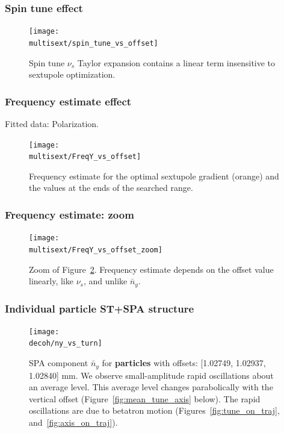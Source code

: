 \documentclass{beamer}
\newcommand{\home}{\string~}
\newcommand{\Artem}{\home/REPOS/COSYINF/img/Artem}
\newcommand{\multisext}{\Artem/multisext_test}
\newcommand{\decoh}{\Artem/decoherence_frequency_dependence}
\begin{document}
\begin{frame}\frametitle{Spin tune effect}
  \begin{figure}[H]
    \centering
    \texttt{[image: \\multisext/spin\_tune\_vs\_offset]}
    \caption{Spin tune $\nu_s$ Taylor expansion contains a linear term insensitive to sextupole optimization.\label{fig:SpinTune_vs_Y0_GSY}}
  \end{figure}
\end{frame}
\begin{frame}\frametitle{Frequency estimate effect}
  Fitted data: Polarization.
  \begin{figure}[H]
    \centering
    \texttt{[image: \\multisext/FreqY\_vs\_offset]}
    \caption{Frequency estimate for the optimal sextupole gradient (orange) and the values at the ends of the searched range.\label{fig:FreqY_vs_offset}}
  \end{figure}
\end{frame}
\begin{frame}\frametitle{Frequency estimate: zoom}
  \begin{figure}[H]
    \texttt{[image: \\multisext/FreqY\_vs\_offset\_zoom]}
    \caption{Zoom of Figure~\ref{fig:FreqY_vs_offset}. Frequency estimate depends on the offset value linearly,
      like  $\nu_s$, and unlike $\bar n_y$.}
  \end{figure}
\end{frame}

\begin{frame}\frametitle{Individual particle ST+SPA structure}
  \begin{figure}[H]
  \centering
  \texttt{[image: \\decoh/ny\_vs\_turn]}
  \caption{SPA component $\bar n_y$ for \textbf{particles} with offsets:
    [1.02749, 1.02937, 1.02840] mm. We observe small-amplitude rapid oscillations about
    an average level. This average level changes parabolically with the vertical
    offset (Figure~\ref{fig:mean_tune_axis} below). The rapid oscillations are
    due to betatron motion (Figures~\ref{fig:tune_on_traj},
    and~\ref{fig:axis_on_traj}).\label{fig:ny_vs_turn}}
\end{figure}
\end{frame}
\end{document}
